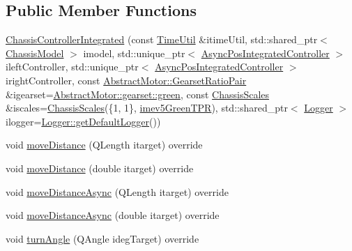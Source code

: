 \subsection*{Public Member Functions}
\begin{DoxyCompactItemize}
\item 
\mbox{\hyperlink{classokapi_1_1ChassisControllerIntegrated_ab78c2cf4add65a424b6bf31c9030f7b2}{Chassis\+Controller\+Integrated}} (const \mbox{\hyperlink{classokapi_1_1TimeUtil}{Time\+Util}} \&itime\+Util, std\+::shared\+\_\+ptr$<$ \mbox{\hyperlink{classokapi_1_1ChassisModel}{Chassis\+Model}} $>$ imodel, std\+::unique\+\_\+ptr$<$ \mbox{\hyperlink{classokapi_1_1AsyncPosIntegratedController}{Async\+Pos\+Integrated\+Controller}} $>$ ileft\+Controller, std\+::unique\+\_\+ptr$<$ \mbox{\hyperlink{classokapi_1_1AsyncPosIntegratedController}{Async\+Pos\+Integrated\+Controller}} $>$ iright\+Controller, const \mbox{\hyperlink{structokapi_1_1AbstractMotor_1_1GearsetRatioPair}{Abstract\+Motor\+::\+Gearset\+Ratio\+Pair}} \&igearset=\mbox{\hyperlink{classokapi_1_1AbstractMotor_a88aaa6ea2fa10f5520a537bbf26774d5a9f27410725ab8cc8854a2769c7a516b8}{Abstract\+Motor\+::gearset\+::green}}, const \mbox{\hyperlink{classokapi_1_1ChassisScales}{Chassis\+Scales}} \&iscales=\mbox{\hyperlink{classokapi_1_1ChassisScales}{Chassis\+Scales}}(\{1, 1\}, \mbox{\hyperlink{namespaceokapi_a5263bab3bfecd482a573b6d04fb584ac}{imev5\+Green\+T\+PR}}), std\+::shared\+\_\+ptr$<$ \mbox{\hyperlink{classokapi_1_1Logger}{Logger}} $>$ ilogger=\mbox{\hyperlink{classokapi_1_1Logger_a5053cf778b4b55acba788a3797dc96d2}{Logger\+::get\+Default\+Logger}}())
\item 
void \mbox{\hyperlink{classokapi_1_1ChassisControllerIntegrated_aa9af3fb56afdb940f92bd8016ef63925}{move\+Distance}} (Q\+Length itarget) override
\item 
void \mbox{\hyperlink{classokapi_1_1ChassisControllerIntegrated_ab0361bc7bb5dc0b4ac4c990c1b9dd14f}{move\+Distance}} (double itarget) override
\item 
void \mbox{\hyperlink{classokapi_1_1ChassisControllerIntegrated_afc97bc450a090d91b57bc6353b4a6972}{move\+Distance\+Async}} (Q\+Length itarget) override
\item 
void \mbox{\hyperlink{classokapi_1_1ChassisControllerIntegrated_ab3cb8eb0c7d5162aafffe8b8ec2751d5}{move\+Distance\+Async}} (double itarget) override
\item 
void \mbox{\hyperlink{classokapi_1_1ChassisControllerIntegrated_a3c2ae782167fd9c6b27d637563e3a066}{turn\+Angle}} (Q\+Angle ideg\+Target) override

\end{DoxyCompactItemize}
